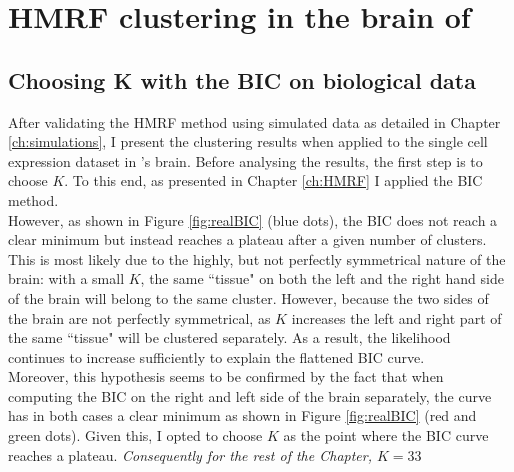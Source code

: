 \chapter{HMRF clustering in the brain of \platyfull{}}\label{ch:biology} 


	\section{Choosing K with the BIC on biological data}
	After validating the HMRF method using simulated data as detailed in Chapter \ref{ch:simulations}, I present the clustering results when applied to the single cell expression dataset in \platy{}'s brain. Before analysing the results, the first step is to choose $K$. To this end, as presented in Chapter \ref{ch:HMRF} I applied the BIC method.\\
	
	However, as shown in Figure \ref{fig:realBIC} (blue dots), the BIC does not reach a clear minimum but instead reaches a plateau after a given number of clusters. This is most likely due to the highly, but not perfectly symmetrical nature of the brain: with a small $K$, the same ``tissue" on both the left and the right hand side of the brain will belong to the same cluster. However, because the two sides of the brain are not perfectly symmetrical, as $K$ increases the left and right part of the same ``tissue" will be clustered separately. As a result, the likelihood continues to increase sufficiently to explain the flattened BIC curve.\\
	
	 Moreover, this hypothesis seems to be confirmed by the fact that when computing the BIC on the right and left side of the brain separately, the curve has in both cases a clear minimum as shown in Figure \ref{fig:realBIC} (red and green dots). Given this, I opted to choose $K$ as the point where the BIC curve reaches a plateau. \emph{Consequently for the rest of the Chapter, $K = 33$}\\
	 
	 
	
